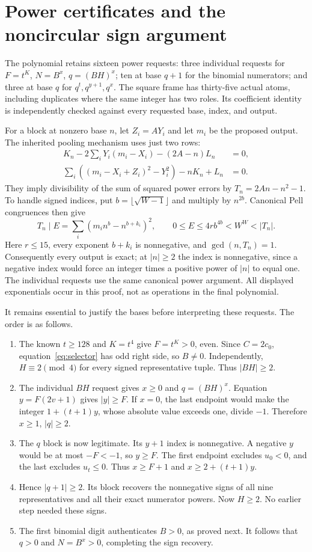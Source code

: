 \documentclass[11pt]{article}
\theoremstyle{definition}\newtheorem{remark}[theorem]{Remark}
\begin{document}
\section{Power certificates and the noncircular sign argument}

The polynomial retains sixteen power requests: three individual requests
for $F=t^K$, $N=B^x$, $q=(BH)^x$; ten at base $q+1$ for the binomial
numerators; and three at base $q$ for $q^t,q^{y+1},q^x$.
The square frame has thirty-five actual atoms, including duplicates where
the same integer has two roles. Its coefficient identity is independently
checked against every requested base, index, and output.

For a block at nonzero base $n$, let $Z_i=AY_i$ and let $m_i$ be the
proposed output. The inherited pooling mechanism uses just two rows:
\begin{align*}
 K_n-2\sum_iY_i(m_i-X_i)-(2A-n)L_n&=0,\\
 \sum_i((m_i-X_i+Z_i)^2-Y_i^2)-nK_n+L_n&=0.
\end{align*}
They imply divisibility of the sum of squared power errors by
$T_n=2An-n^2-1$. To handle signed indices, put
$b=\lfloor\sqrt{W-1}\rfloor$ and multiply by $n^{2b}$. Canonical
Pell congruences then give
\[
 T_n\mid E=\sum_i(m_i n^b-n^{b+k_i})^2,
 \qquad 0\le E\le4r b^{4b}<W^W<|T_n|.
\]
Here $r\le15$, every exponent $b+k_i$ is nonnegative, and
$\gcd(n,T_n)=1$. Consequently every output is exact; at $|n|\ge2$
the index is nonnegative, since a negative index would force an integer
times a positive power of $|n|$ to equal one. The individual requests
use the same canonical power argument. All displayed exponentials occur
in this proof, not as operations in the final polynomial.

It remains essential to justify the bases before interpreting these
requests. The order is as follows.
\begin{enumerate}
\item The known $t\ge128$ and $K=t^4$ give $F=t^K>0$, even.
      Since $C=2c_0$, equation~\eqref{eq:selector} has odd right side,
      so $B\ne0$. Independently, $H\equiv2\pmod4$ for every signed
      representative tuple. Thus $|BH|\ge2$.
\item The individual $BH$ request gives $x\ge0$ and $q=(BH)^x$.
      Equation $y=F(2v+1)$ gives $|y|\ge F$. If $x=0$, the last
      endpoint would make the integer $1+(t+1)y$, whose absolute value
      exceeds one, divide $-1$. Therefore $x\ge1$, $|q|\ge2$.
\item The $q$ block is now legitimate. Its $y+1$ index is nonnegative.
      A negative $y$ would be at most $-F<-1$, so $y\ge F$.
      The first endpoint excludes $u_0<0$, and the last excludes
      $u_t\le0$. Thus $x\ge F+1$ and $x\ge2+(t+1)y$.
\item Hence $|q+1|\ge2$. Its block recovers the nonnegative signs
      of all nine representatives and all their exact numerator powers.
      Now $H\ge2$. No earlier step needed these signs.
\item The first binomial digit authenticates $B>0$, as proved next.
      It follows that $q>0$ and $N=B^x>0$, completing the sign recovery.
\end{enumerate}
\end{document}
